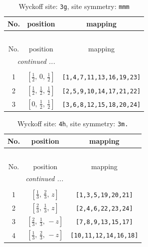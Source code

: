 \documentclass[fleqn,8pt]{jsarticle}
\begin{document}
\begin{longtable}{ccc}
\caption{Wyckoff site: {\tt 3g}, site symmetry: {\tt mmm}}
 \\
 \hline \hline
No. & position & mapping \\ \hline \endfirsthead

\multicolumn{2}{l}{\tablename\ \thetable{}} \\
 \hline \hline
No. & position & mapping \\ \hline \endhead

 \hline \hline
\multicolumn{2}{r}{\footnotesize\it continued ...} \\ \endfoot

 \hline \hline
\multicolumn{2}{r}{} \\ \endlastfoot

1 & $\left[ \frac{1}{2},\, 0,\, \frac{1}{2} \right]$ & {\tt [1,4,7,11,13,16,19,23]} \\ \hline
2 & $\left[ \frac{1}{2},\, \frac{1}{2},\, \frac{1}{2} \right]$ & {\tt [2,5,9,10,14,17,21,22]} \\ \hline
3 & $\left[ 0,\, \frac{1}{2},\, \frac{1}{2} \right]$ & {\tt [3,6,8,12,15,18,20,24]} \\
\end{longtable}
\renewcommand{\arraystretch}{1.2}
\begin{longtable}{ccc}
\caption{Wyckoff site: {\tt 4h}, site symmetry: {\tt 3m.}}
 \\
 \hline \hline
No. & position & mapping \\ \hline \endfirsthead

\multicolumn{2}{l}{\tablename\ \thetable{}} \\
 \hline \hline
No. & position & mapping \\ \hline \endhead

 \hline \hline
\multicolumn{2}{r}{\footnotesize\it continued ...} \\ \endfoot

 \hline \hline
\multicolumn{2}{r}{} \\ \endlastfoot

1 & $\left[ \frac{1}{3},\, \frac{2}{3},\, z \right]$ & {\tt [1,3,5,19,20,21]} \\ \hline
2 & $\left[ \frac{2}{3},\, \frac{1}{3},\, z \right]$ & {\tt [2,4,6,22,23,24]} \\ \hline
3 & $\left[ \frac{2}{3},\, \frac{1}{3},\, - z \right]$ & {\tt [7,8,9,13,15,17]} \\ \hline
4 & $\left[ \frac{1}{3},\, \frac{2}{3},\, - z \right]$ & {\tt [10,11,12,14,16,18]} \\
\end{longtable}
\end{document}
